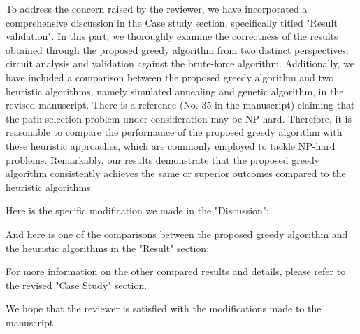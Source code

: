 \begin{revresponse}



To address the concern raised by the reviewer, we have incorporated a comprehensive discussion in the Case study section, specifically titled "Result validation". 
In this part, we thoroughly examine the correctness of the results obtained through the proposed greedy algorithm from two distinct perspectives: circuit analysis and validation against the brute-force algorithm. 
Additionally, we have included a comparison between the proposed greedy algorithm and two heuristic algorithms, namely simulated annealing and genetic algorithm, in the revised manuscript. 
There is a reference (No. 35 in the manuscript) claiming that the path selection problem under consideration may be NP-hard.
Therefore, it is reasonable to compare the performance of the proposed greedy algorithm with these heuristic approaches, which are commonly employed to tackle NP-hard problems.
Remarkably, our results demonstrate that the proposed greedy algorithm consistently achieves the same or superior outcomes compared to the heuristic algorithms.


Here is the specific modification we made in the "Discussion":
\begin{changes}
\end{changes}
And here is one of the comparisons between the proposed greedy algorithm and the heuristic algorithms in the "Result" section:
\begin{changes}
\end{changes}
For more information on the other compared results and details, please refer to the revised "Case Study" section.


We hope that the reviewer is satisfied with the modifications made to the manuscript.
\end{revresponse}

